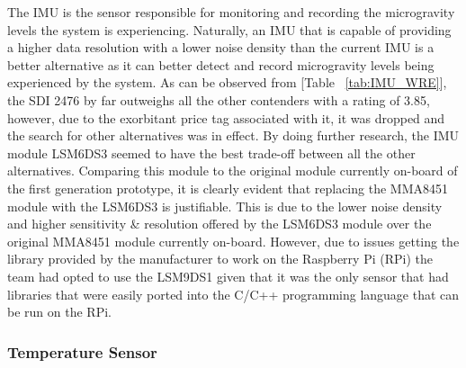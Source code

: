 \indent\indent The IMU is the sensor responsible for monitoring and recording the microgravity levels the system is experiencing. Naturally, an IMU that is capable of providing a higher data resolution with a lower noise density than the current IMU is a better alternative as it can better detect and record microgravity levels being experienced by the system. As can be observed from [Table ~\ref{tab:IMU_WRE}], the SDI 2476 by far outweighs all the other contenders with a rating of 3.85, however, due to the exorbitant price tag associated with it, it was dropped and the search for other alternatives was in effect. By doing further research, the IMU module LSM6DS3 seemed to have the best trade-off between all the other alternatives. Comparing this module to the original module currently on-board of the first generation prototype, it is clearly evident that replacing the MMA8451 module with the LSM6DS3 is justifiable. This is due to the lower noise density and higher sensitivity \& resolution offered by the LSM6DS3 module over the original MMA8451 module currently on-board. However, due to issues getting the library provided by the manufacturer to work on the Raspberry Pi (RPi) the team had opted to use the LSM9DS1 given that it was the only sensor that had libraries that were easily ported into the C/C++ programming language that can be run on the RPi.


\subsubsection{Temperature Sensor}

